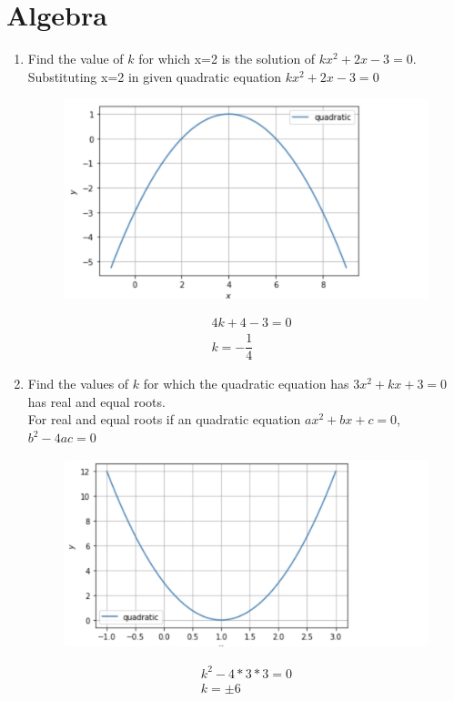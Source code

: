 \documentclass[journal,12pt,twocolumn]{IEEEtran}
\renewcommand\thesection{\arabic{section}}
\begin{document}
\section{Algebra}
\renewcommand{\theequation}{\theenumi}
\begin{enumerate}[label=\thesection.\arabic*.,ref=\thesection.\theenumi]
\item Find the value of $k$ for which x=2 is the solution of $kx^2+2x-3 = 0$.\\
\solution Substituting x=2 in given quadratic equation $kx^2+2x-3 = 0$ \\
 \begin{figure}
	  \centering 
	  \includegraphics[width=\columnwidth]{5.1}
	  \caption{}
	  \label{fig:geometry-3.9.pdf}
 \end{figure}
\begin{align}
& 4k+4-3=0 \nonumber\\
& k = -\dfrac{1}{4} \nonumber 
\end{align}   

\item Find the values of $k$ for which the quadratic equation has $3x^2+kx+3 = 0$ has real and equal roots. \\
\solution For real and equal roots if an quadratic equation $ax^2+bx+c=0$, $b^2-4ac = 0$ \\
 \begin{figure}
	  \centering 
	  \includegraphics[width=\columnwidth]{5.2}
	  \caption{}
	  \label{fig:geometry-3.9.pdf}
 \end{figure}
\begin{align}
k^2-4*3*3 =0 \nonumber \\
k = \pm 6 \nonumber
\end{align}


\end{enumerate}
\end{document}
